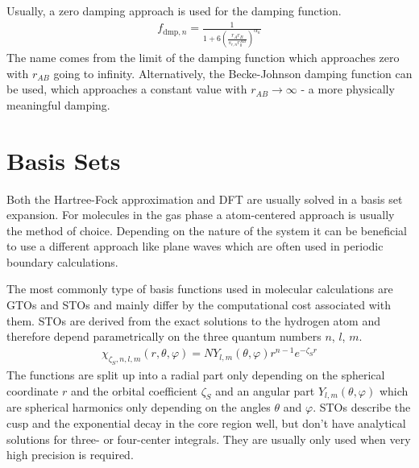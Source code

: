 Usually, a zero damping approach is used for the damping function.
%
\begin{align}
	f_{\text{dmp},n} = \frac{1}{1+6\left( \frac{r_Ar_B}{s_{r,n}r_0^{AB}} \right)^{\alpha_n}}
\end{align}
%
The name comes from the limit of the damping function which approaches zero with
$r_{AB}$ going to infinity. Alternatively, the Becke-Johnson damping function
can be used, which approaches a constant value with $r_{AB}\to\infty$ - a more
physically meaningful damping.

\section{Basis Sets}
\label{sec:basissets}

Both the Hartree-Fock approximation and \ac{DFT} are usually solved in a basis
set expansion. For molecules in the gas phase a atom-centered approach is
usually the method of choice. Depending on the nature of the system it can be
beneficial to use a different approach like plane waves which are often used in
periodic boundary calculations.

The most commonly type of basis functions used in molecular calculations are
\acp{GTO} and \acp{STO} and mainly differ by the computational cost associated
with them. \acp{STO} are derived from the exact solutions to the hydrogen atom
and therefore depend parametrically on the three quantum numbers $n$,
$l$, $m$.
%
\begin{align}
    \chi_{\zeta_S,n,l,m}(r,\theta,\varphi) = NY_{l,m}(\theta,\varphi)r^{n-1}e^{-\zeta_S r}
\end{align}
%
The functions are split up into a radial part only depending on the spherical
coordinate $r$ and the orbital coefficient $\zeta_S$ and an angular part
$Y_{l,m}(\theta,\varphi)$ which are spherical harmonics only depending on the
angles $\theta$ and $\varphi$. \acp{STO} describe the cusp and the exponential
decay in the core region well, but don't have analytical solutions for three-
or four-center integrals. They are usually only used when very high precision
is required.

